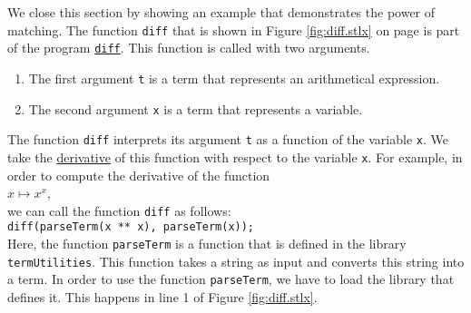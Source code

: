 \noindent
We close this section by showing an example that demonstrates the power of matching.
The function \texttt{diff} that is shown in Figure \ref{fig:diff.stlx} on page \pageref{fig:diff.stlx} is part
of the program
\href{https://github.com/karlstroetmann/Logik/blob/master/SetlX/diff.stlx}{\texttt{diff}}.
This function is called with two arguments.
\begin{enumerate}
\item The first argument \texttt{t} is a term that represents an arithmetical expression.
\item The second argument \texttt{x} is a term that represents a variable.
\end{enumerate}
The function \texttt{diff} interprets its argument \texttt{t} as a function of the variable
\texttt{x}.  We take the \href{https://en.wikipedia.org/wiki/Derivative}{derivative} of this
function with respect to the variable \texttt{x}.  For example, in order to compute the derivative of
the function
\\[0.2cm]
\hspace*{1.3cm}
$x \mapsto x^x$,
\\[0.2cm]
we can call the function  \texttt{diff} as follows:
\\[0.2cm]
\hspace*{1.3cm}
\texttt{diff(parseTerm(x ** x), parseTerm(x));}
\\[0.2cm]
Here, the function \texttt{parseTerm} is a function that is defined in the library \texttt{termUtilities}.
This function takes a string as input and converts this string into a term.  In order to use the function
\texttt{parseTerm}, we have to load the library that defines it.  This happens in line 1 of Figure
\ref{fig:diff.stlx}. 

